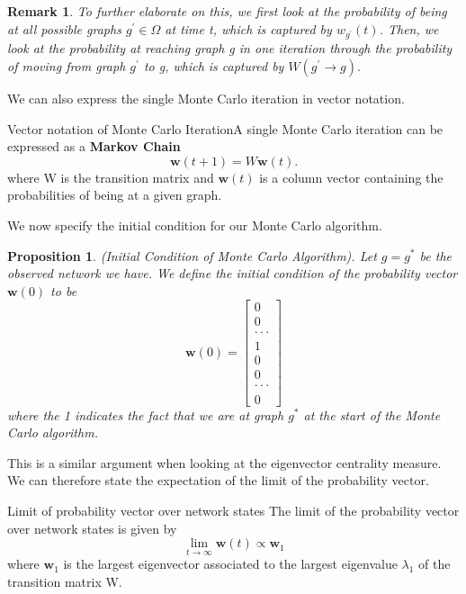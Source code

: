 \documentclass[twoside]{article}
\newtheorem{proposition}[theorem]{Proposition}
\newtheorem{remark}[theorem]{Remark}
\begin{document}
\begin{remark} To further elaborate on this, we first look at the probability of being at all possible graphs $g^{'} \in \Omega$ at time t, which is captured by $w_{g^{'}}(t)$. Then, we look at the probability at reaching graph g in one iteration through the probability of moving from graph $g^{'}$ to g, which is captured by $W(g^{'} \rightarrow g).$
\end{remark}

We can also express the single Monte Carlo iteration in vector notation.

\begin{proposition_exam}{Vector notation of Monte Carlo Iteration}{}A single Monte Carlo iteration can be expressed as a \textbf{Markov Chain}
$$
\textbf{w}(t + 1) = W\textbf{w}(t).
$$
where W is the transition matrix and $\textbf{w}(t)$ is a column vector containing the probabilities of being at a given graph.
\end{proposition_exam}

We now specify the initial condition for our Monte Carlo algorithm.
\begin{proposition}(Initial Condition of Monte Carlo Algorithm). Let $g = g^*$ be the observed network we have. We define the initial condition of the probability vector $\textbf{w}(0)$ to be 
$$
\textbf{w}(0) = 
\begin{bmatrix}
0 \\
0 \\
\cdot \cdot \cdot \\
1 \\
0 \\
0\\
\cdot \cdot \cdot \\
0
\end{bmatrix}
$$
where the 1 indicates the fact that we are at graph $g^*$ at the start of the Monte Carlo algorithm.
\end{proposition}

This is a similar argument when looking at the eigenvector centrality measure. We can therefore state the expectation of the limit of the probability vector. 
\begin{theorem_exam}{Limit of probability vector over network states}{} The limit of the probability vector over network states is given by 
$$
\lim_{t \rightarrow \infty}\textbf{w}(t) \propto \textbf{w}_1
$$
where $\textbf{w}_1$ is the largest eigenvector associated to the largest eigenvalue $\lambda_1$ of the transition matrix W.
\end{theorem_exam}
\end{document}
